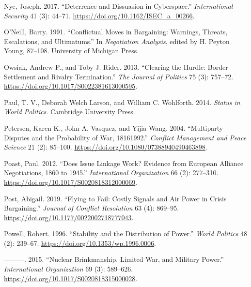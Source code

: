 \documentclass[
]{article}
\begin{document}
\leavevmode\hypertarget{ref-nye_deterrencedissuasioncyberspace_2017}{}%
Nye, Joseph. 2017. ``Deterrence and Dissuasion in Cyberspace.'' \emph{International Security} 41 (3): 44--71. \url{https://doi.org/10.1162/ISEC_a_00266}.

\leavevmode\hypertarget{ref-oneill_conflictualmovesbargaining_1991}{}%
O'Neill, Barry. 1991. ``Conflictual Moves in Bargaining: Warnings, Threats, Escalations, and Ultimatums.'' In \emph{Negotiation Analysis}, edited by H. Peyton Young, 87--108. University of Michigan Press.

\leavevmode\hypertarget{ref-owsiak_clearinghurdleborder_2013}{}%
Owsiak, Andrew P., and Toby J. Rider. 2013. ``Clearing the Hurdle: Border Settlement and Rivalry Termination.'' \emph{The Journal of Politics} 75 (3): 757--72. \url{https://doi.org/10.1017/S0022381613000595}.

\leavevmode\hypertarget{ref-paul_statusworldpolitics_2014}{}%
Paul, T. V., Deborah Welch Larson, and William C. Wohlforth. 2014. \emph{Status in World Politics}. Cambridge University Press.

\leavevmode\hypertarget{ref-petersen_multipartydisputesprobability_2004}{}%
Petersen, Karen K., John A. Vasquez, and Yijia Wang. 2004. ``Multiparty Disputes and the Probability of War, 18161992.'' \emph{Conflict Management and Peace Science} 21 (2): 85--100. \url{https://doi.org/10.1080/07388940490463898}.

\leavevmode\hypertarget{ref-poast_doesissuelinkage_2012}{}%
Poast, Paul. 2012. ``Does Issue Linkage Work? Evidence from European Alliance Negotiations, 1860 to 1945.'' \emph{International Organization} 66 (2): 277--310. \url{https://doi.org/10.1017/S0020818312000069}.

\leavevmode\hypertarget{ref-post_flyingfailcostly_2019}{}%
Post, Abigail. 2019. ``Flying to Fail: Costly Signals and Air Power in Crisis Bargaining.'' \emph{Journal of Conflict Resolution} 63 (4): 869--95. \url{https://doi.org/10.1177/0022002718777043}.

\leavevmode\hypertarget{ref-powell_stabilitydistributionpower_1996}{}%
Powell, Robert. 1996. ``Stability and the Distribution of Power.'' \emph{World Politics} 48 (2): 239--67. \url{https://doi.org/10.1353/wp.1996.0006}.

\leavevmode\hypertarget{ref-powell_nuclearbrinkmanshiplimited_2015}{}%
---------. 2015. ``Nuclear Brinkmanship, Limited War, and Military Power.'' \emph{International Organization} 69 (3): 589--626. \url{https://doi.org/10.1017/S0020818315000028}.
\end{document}
